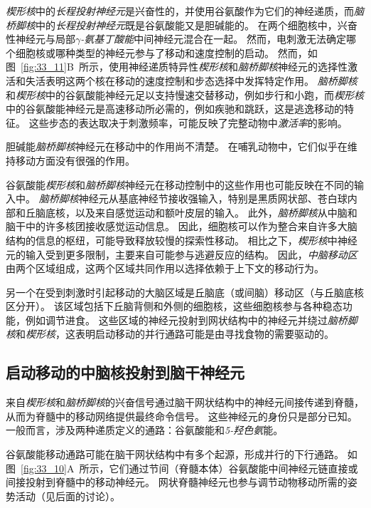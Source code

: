 \textit{楔形核}中的\textit{长程投射神经元}是兴奋性的，并使用谷氨酸作为它们的神经递质，而\textit{脑桥脚核}中的\textit{长程投射神经元}既是谷氨酸能又是胆碱能的。
在两个细胞核中，兴奋性神经元与局部\textit{$\gamma$-氨基丁酸能}中间神经元混合在一起。
然而，电刺激无法确定哪个细胞核或哪种类型的神经元参与了移动和速度控制的启动。
然而，如图~\ref{fig:33_11}B~所示，使用神经递质特异性\textit{楔形核}和\textit{脑桥脚核}神经元的选择性激活和失活表明这两个核在移动的速度控制和步态选择中发挥特定作用。
\textit{脑桥脚核}和\textit{楔形核}中的谷氨酸能神经元足以支持慢速交替移动，例如步行和小跑，而\textit{楔形核}中的谷氨酸能神经元是高速移动所必需的，例如疾驰和跳跃，这是逃逸移动的特征。
这些步态的表达取决于刺激频率，可能反映了完整动物中\textit{激活率}的影响。


胆碱能\textit{脑桥脚核}神经元在移动中的作用尚不清楚。
在哺乳动物中，它们似乎在维持移动方面没有很强的作用。


谷氨酸能\textit{楔形核}和\textit{脑桥脚核}神经元在移动控制中的这些作用也可能反映在不同的输入中。
\textit{脑桥脚核}神经元从基底神经节接收强输入，特别是黑质网状部、苍白球内部和丘脑底核，以及来自感觉运动和额叶皮层的输入。
此外，\textit{脑桥脚核}从中脑和脑干中的许多核团接收感觉运动信息。
因此，细胞核可以作为整合来自许多大脑结构的信息的枢纽，可能导致释放较慢的探索性移动。
相比之下，\textit{楔形核}中神经元的输入受到更多限制，主要来自可能参与逃避反应的结构。
因此，\textit{中脑移动区}由两个区域组成，这两个区域共同作用以选择依赖于上下文的移动行为。


另一个在受到刺激时引起移动的大脑区域是丘脑底（或间脑）移动区（与丘脑底核区分开）。
该区域包括下丘脑背侧和外侧的细胞核，这些细胞核参与各种稳态功能，例如调节进食。
这些区域的神经元投射到网状结构中的神经元并绕过\textit{脑桥脚核}和\textit{楔形核}，这表明启动移动的并行通路可能是由寻找食物的需要驱动的。



\subsection{启动移动的中脑核投射到脑干神经元}

来自\textit{楔形核}和\textit{脑桥脚核}的兴奋信号通过脑干网状结构中的神经元间接传递到脊髓，从而为脊髓中的移动网络提供最终命令信号。
这些神经元的身份只是部分已知。
一般而言，涉及两种递质定义的通路：谷氨酸能和\textit{5-羟色氨}能。


谷氨酸能移动通路可能在脑干网状结构中有多个起源，形成并行的下行通路。
如图~\ref{fig:33_10}A~所示，它们通过节间（脊髓本体）谷氨酸能中间神经元链直接或间接投射到脊髓中的移动神经元。
网状脊髓神经元也参与调节动物移动所需的姿势活动（见后面的讨论）。


